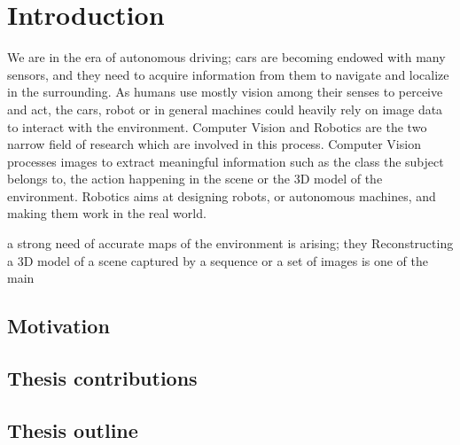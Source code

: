 
\chapter*{Introduction}
\label{sec:intro}
We are in the era of autonomous driving; cars are becoming endowed with many sensors, and they need to acquire information from them to navigate and localize in the surrounding.
As humans use mostly vision among their senses to perceive and act, the cars, robot or in general machines could heavily rely on image data to interact with the environment.
Computer Vision and Robotics are the two narrow field of research which are involved in this process. 
Computer Vision processes images to extract meaningful information such as the class the subject belongs to, the action happening in the scene or the 3D model of the environment.
Robotics aims at designing robots, or autonomous machines, and making them work in the real world.

a strong need of accurate maps of the environment is arising; they 
Reconstructing a 3D model of a scene captured by a sequence or a set of images is one of the main




\section{Motivation}

\section{Thesis contributions}
\section{Thesis outline}